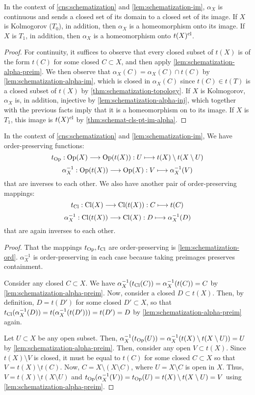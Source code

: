 \begin{thm}\label{thm:schematization-alpha-cont}
In the context of \cref{cns:schematization} and \cref{lem:schematization-im},
$\alpha_X$ is continuous and sends a closed set of its domain
to a closed set of its image. If $X$ is Kolmogorov ($T_0$), in addition, then
$\alpha_X$ is a homeomorphism onto its image. If $X$ is $T_1$, in addition,
then $\alpha_X$ is a homeomorphism onto $t(X)^{\mathrm{cl}}$.
\end{thm}
\begin{proof}
For continuity, it suffices to observe that every closed subset of
$t(X)$ is of the form $t(C)$ for some closed $C \subset X$,
and then apply \cref{lem:schematization-alpha-preim}.
We then observe that $\alpha_X(C) = \alpha_X(C) \cap t(C)$
by \cref{lem:schematization-alpha-im}, which is closed in $\alpha_X(C)$
since $t(C) \in t(T)$ is a closed subset of $t(X)$ by
\cref{thm:schematization-topology}. If $X$ is Kolmogorov,
$\alpha_X$ is, in addition, injective by \cref{lem:schematization-alpha-inj},
which together with the previous facts imply that it is a homeomorphism
on to its image. If $X$ is $T_1$, this image is $t(X)^{\mathrm{cl}}$ by
\cref{thm:schemat-cls-pt-im-alpha}.
\end{proof}

\begin{thm}\label{thm:schematization-ord-iso}
In the context of \cref{cns:schematization} and \cref{lem:schematization-im},
We have order-preserving functions:
\[
t_\Op : \Op(X) \to \Op(t(X)) : U \mapsto t(X) \setminus t(X \setminus U)
\]
\[
\alpha_X^{-1} : \Op(t(X)) \to \Op(X) : V \mapsto \alpha_X^{-1}(V)
\]
that are inverses to each other. We also have another pair
of order-preserving mappings:
\[
t_\Cl : \Cl(X) \to \Cl(t(X)) : C \mapsto t(C)
\]
\[
\alpha_X^{-1} : \Cl(t(X)) \to \Cl(X) : D \mapsto \alpha_X^{-1}(D)
\]
that are again inverses to each other.
\end{thm}
\begin{proof}
That the mappings $t_{\mathrm{Op}}, t_{\mathrm{Cl}}$ are order-preserving is
\cref{lem:schematization-ord}. $\alpha_X^{-1}$ is order-preserving in each
case because taking preimages preserves containment.

Consider any closed $C \subset X$. We have
$\alpha_X^{-1}(t_{\mathrm{Cl}}(C)) = \alpha_X^{-1}(t(C)) = C$
by \cref{lem:schematization-alpha-preim}.
Now, consider a closed $D \subset t(X)$. Then, by definition,
$D = t(D')$ for some closed $D' \subset X$, so that
$t_{\mathrm{Cl}}(\alpha_X^{-1}(D)) = t(\alpha_X^{-1}(t(D'))) = t(D') = D$
by \cref{lem:schematization-alpha-preim} again.

Let $U \subset X$ be any open subset. Then,
$\alpha_X^{-1}(t_{\mathrm{Op}}(U)) = \alpha_X^{-1}(t(X) \setminus t(X \setminus U))
= U$ by \cref{lem:schematization-alpha-preim}. Then, consider
any open $V \subset t(X)$. Since $t(X) \setminus V$ is closed, it must be
equal to $t(C)$ for some closed $C \subset X$ so that
$V = t(X) \setminus t(C)$. Now, $C = X \setminus (X \setminus C)$,
where $U = X \setminus C$ is open in $X$. Thus,
$V = t(X) \setminus t(X \setminus U)$ and
$t_{\mathrm{Op}}(\alpha_X^{-1}(V)) = t_{\mathrm{Op}}(U) = t(X) \setminus t(X \setminus U) = V$
using \cref{lem:schematization-alpha-preim}.
\end{proof}

